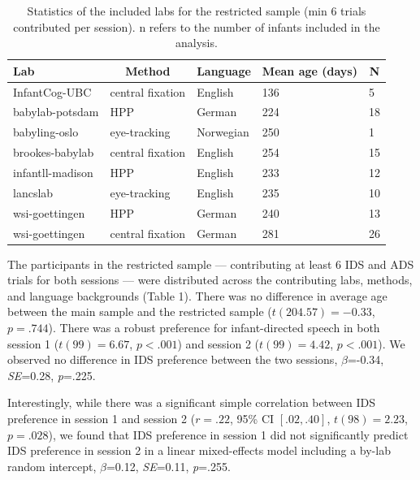 \documentclass[
  man, donotrepeattitle,floatsintext]{apa6}
\begin{document}
\begin{table}[tbp]

\begin{center}
\begin{threeparttable}

\caption{\label{tab:labs6}Statistics of the included labs for the restricted sample (min 6 trials contributed per session). n refers to the number of infants included in the analysis.}

\begin{tabular}{lllll}
\toprule
Lab & \multicolumn{1}{c}{Method} & \multicolumn{1}{c}{Language} & \multicolumn{1}{c}{Mean age (days)} & \multicolumn{1}{c}{N}\\
\midrule
InfantCog-UBC & central fixation & English & 136 & 5\\
babylab-potsdam & HPP & German & 224 & 18\\
babyling-oslo & eye-tracking & Norwegian & 250 & 1\\
brookes-babylab & central fixation & English & 254 & 15\\
infantll-madison & HPP & English & 233 & 12\\
lancslab & eye-tracking & English & 235 & 10\\
wsi-goettingen & HPP & German & 240 & 13\\
wsi-goettingen & central fixation & German & 281 & 26\\
\bottomrule
\end{tabular}

\end{threeparttable}
\end{center}

\end{table}

The participants in the restricted sample --- contributing at least 6 IDS and ADS trials for both sessions --- were distributed across the contributing labs, methods, and language backgrounds (Table 1). There was no difference in average age between the main sample and the restricted sample (\(t(204.57) = -0.33\), \(p = .744\)). There was a robust preference for infant-directed speech in both session 1 (\(t(99) = 6.67\), \(p < .001\)) and session 2 (\(t(99) = 4.42\), \(p < .001\)). We observed no difference in IDS preference between the two sessions, \(\beta\)=-0.34, \emph{SE}=0.28, \emph{p}=.225.

Interestingly, while there was a significant simple correlation between IDS preference in session 1 and session 2 (\(r = .22\), 95\% CI \([.02, .40]\), \(t(98) = 2.23\), \(p = .028\)), we found that IDS preference in session 1 did not significantly predict IDS preference in session 2 in a linear mixed-effects model including a by-lab random intercept, \(\beta\)=0.12, \emph{SE}=0.11, \emph{p}=.255.
\end{document}
